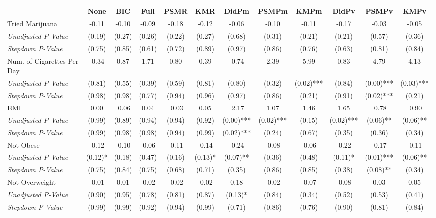 \begin{tabular}{l c c c c c c c c c c c}
\toprule
 & None & BIC & Full & PSMR & KMR & DidPm & PSMPm & KMPm & DidPv & PSMPv & KMPv \\
\midrule
Tried Marijuana & -0.11 & -0.10 & -0.09 & -0.18 & -0.12 & -0.06 & -0.10 & -0.11 & -0.17 & -0.03 & -0.05 \\
\quad \textit{Unadjusted P-Value} & (0.19) & (0.27) & (0.26) & (0.22) & (0.27) & (0.68) & (0.31) & (0.21) & (0.21) & (0.57) & (0.36) \\
\quad \textit{Stepdown P-Value} & (0.75) & (0.85) & (0.61) & (0.72) & (0.89) & (0.97) & (0.86) & (0.76) & (0.63) & (0.81) & (0.84) \\
Num. of Cigarettes Per Day & -0.34 & 0.87 & 1.71 & 0.80 & 0.39 & -0.74 & 2.39 & 5.99 & 0.83 & 4.79 & 4.13 \\
\quad \textit{Unadjusted P-Value} & (0.81) & (0.55) & (0.39) & (0.59) & (0.81) & (0.80) & (0.32) & (0.02)*** & (0.84) & (0.00)*** & (0.03)*** \\
\quad \textit{Stepdown P-Value} & (0.98) & (0.98) & (0.77) & (0.94) & (0.96) & (0.97) & (0.86) & (0.21) & (0.91) & (0.02)*** & (0.21) \\
BMI & 0.00 & -0.06 & 0.04 & -0.03 & 0.05 & -2.17 & 1.07 & 1.46 & 1.65 & -0.78 & -0.90 \\
\quad \textit{Unadjusted P-Value} & (0.99) & (0.89) & (0.94) & (0.94) & (0.92) & (0.00)*** & (0.02)*** & (0.15) & (0.02)*** & (0.06)** & (0.06)** \\
\quad \textit{Stepdown P-Value} & (0.99) & (0.98) & (0.98) & (0.94) & (0.99) & (0.02)*** & (0.24) & (0.67) & (0.35) & (0.36) & (0.34) \\
Not Obese & -0.12 & -0.10 & -0.06 & -0.11 & -0.14 & -0.24 & -0.08 & -0.06 & -0.22 & -0.17 & -0.11 \\
\quad \textit{Unadjusted P-Value} & (0.12)* & (0.18) & (0.47) & (0.16) & (0.13)* & (0.07)** & (0.36) & (0.48) & (0.11)* & (0.01)*** & (0.06)** \\
\quad \textit{Stepdown P-Value} & (0.75) & (0.84) & (0.75) & (0.68) & (0.71) & (0.35) & (0.86) & (0.85) & (0.38) & (0.08)** & (0.34) \\
Not Overweight & -0.01 & 0.01 & -0.02 & -0.02 & -0.02 & 0.18 & -0.02 & -0.07 & -0.08 & 0.03 & 0.05 \\
\quad \textit{Unadjusted P-Value} & (0.90) & (0.95) & (0.78) & (0.81) & (0.87) & (0.13)* & (0.84) & (0.34) & (0.52) & (0.53) & (0.41) \\
\quad \textit{Stepdown P-Value} & (0.99) & (0.99) & (0.92) & (0.94) & (0.99) & (0.71) & (0.86) & (0.76) & (0.90) & (0.81) & (0.84) \\

\end{tabular}
